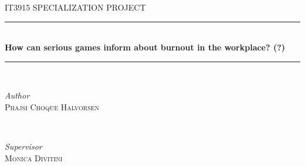 
\begin{titlepage} %
	\newcommand{\HRule}{\rule{\linewidth}{0.5mm}} %
	
	\center %
	
	
	\textsc{\LARGE IT3915 SPECIALIZATION PROJECT}\\[1.5cm] %
	
	

	
	
	\HRule\\[0.4cm]
	
	{\huge\bfseries How can serious games inform about burnout in the workplace? (?)}\\[0.4cm] %
	

	\HRule\\[1.5cm]
	

	
	\begin{minipage}{0.4\textwidth}
		\begin{flushleft}
			\large
			\textit{Author}\\
			\textsc{Phajsi Choque Halvorsen\\} %
		\end{flushleft}
	\end{minipage}
	~
	\begin{minipage}{0.4\textwidth}
		\begin{flushright}
			\large
			\textit{Supervisor}\\
			\textsc{Monica Divitini\\}
		\end{flushright}
	\end{minipage}
	
	
\vfill\vfill\vfill\vfill\vfill\vfill\vfill\vfill\vfill\vfill\vfill\vfill\vfill\vfill\vfill\vfill\vfill\vfill\vfill\vfill\vfill\vfill\vfill\vfill\vfill\vfill


\end{titlepage}
